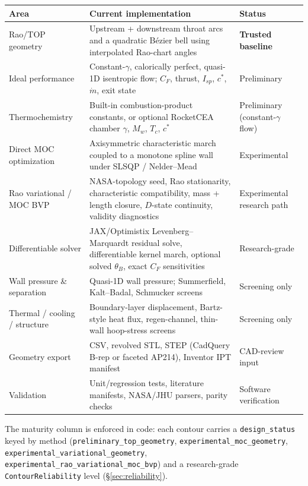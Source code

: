 \documentclass[11pt]{article}
\newcommand{\cmd}[1]{\nolinkurl{#1}}
\newcommand{\code}[1]{\texttt{#1}}
\begin{document}
\renewcommand{\arraystretch}{1.25}
\begin{longtable}{p{}p{}p{}}
\toprule
\textbf{Area} & \textbf{Current implementation} & \textbf{Status} \\
\midrule
\endhead
Rao/TOP geometry & Upstream + downstream throat arcs and a quadratic B\'ezier
bell using interpolated Rao-chart angles & \textbf{Trusted baseline} \\
Ideal performance & Constant-$\gamma$, calorically perfect, quasi-1D
isentropic flow; $C_F$, thrust, $I_{sp}$, $c^*$, $\dot m$, exit state &
Preliminary \\
Thermochemistry & Built-in combustion-product constants, or optional
RocketCEA chamber $\gamma$, $M_w$, $T_c$, $c^*$ & Preliminary
(constant-$\gamma$ flow) \\
Direct MOC optimization & Axisymmetric characteristic march coupled to a
monotone spline wall under SLSQP / Nelder--Mead & Experimental \\
Rao variational / MOC BVP & NASA-topology seed, Rao stationarity,
characteristic compatibility, mass + length closure, $D$-state continuity,
validity diagnostics & Experimental research path \\
Differentiable solver & JAX/Optimistix Levenberg--Marquardt residual solve,
differentiable kernel march, optional solved $\theta_B$, exact $C_F$
sensitivities & Research-grade \\
Wall pressure \& separation & Quasi-1D wall pressure; Summerfield,
Kalt--Badal, Schmucker screens & Screening only \\
Thermal / cooling / structure & Boundary-layer displacement, Bartz-style heat
flux, regen-channel, thin-wall hoop-stress screens & Screening only \\
Geometry export & CSV, revolved STL, STEP (CadQuery B-rep or faceted AP214),
Inventor IPT manifest & CAD-review input \\
Validation & Unit/regression tests, literature manifests, NASA/JHU parsers,
parity checks & Software verification \\
\bottomrule
\end{longtable}
\renewcommand{\arraystretch}{1.0}

\begin{sloppypar}
The maturity column is enforced in code: each contour carries a
\cmd{design_status} keyed by method
(\cmd{preliminary_top_geometry}, \cmd{experimental_moc_geometry},
\cmd{experimental_variational_geometry},
\cmd{experimental_rao_variational_moc_bvp}) and a research-grade
\code{ContourReliability} level (\S\ref{sec:reliability}).
\end{sloppypar}
\end{document}

